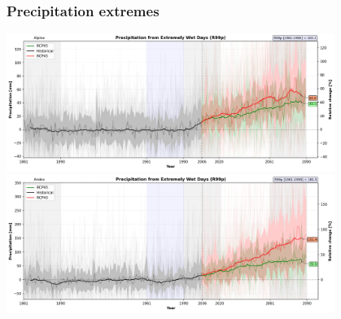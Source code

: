 
\begin{frame}
\frametitle{Precipitation extremes}
\begin{center}

{\includegraphics[width=0.8\textwidth]{risultati/r99p_Alpine_Models_ts}}
{\includegraphics[width=0.8\textwidth]{risultati/r99p_Andes_Models_ts}}
\end{center}
\end{frame}

%
